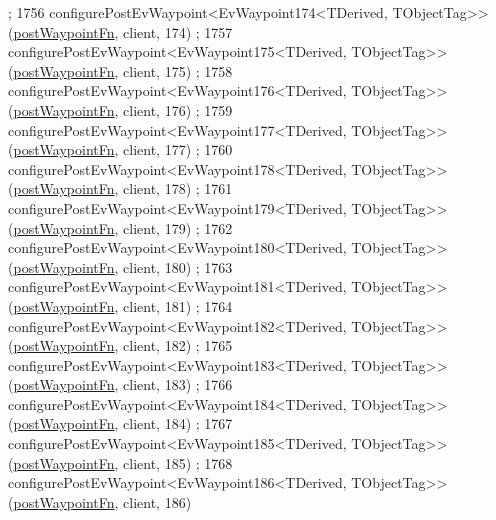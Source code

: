 \begin{DoxyCode}
      ;
1756     configurePostEvWaypoint<EvWaypoint174<TDerived, TObjectTag>>(\hyperlink{classcl__move__base__z_1_1WaypointEventDispatcher_a964a57fcce5d48ec60243230722d8dd7}{postWaypointFn}, client, 174)
      ;
1757     configurePostEvWaypoint<EvWaypoint175<TDerived, TObjectTag>>(\hyperlink{classcl__move__base__z_1_1WaypointEventDispatcher_a964a57fcce5d48ec60243230722d8dd7}{postWaypointFn}, client, 175)
      ;
1758     configurePostEvWaypoint<EvWaypoint176<TDerived, TObjectTag>>(\hyperlink{classcl__move__base__z_1_1WaypointEventDispatcher_a964a57fcce5d48ec60243230722d8dd7}{postWaypointFn}, client, 176)
      ;
1759     configurePostEvWaypoint<EvWaypoint177<TDerived, TObjectTag>>(\hyperlink{classcl__move__base__z_1_1WaypointEventDispatcher_a964a57fcce5d48ec60243230722d8dd7}{postWaypointFn}, client, 177)
      ;
1760     configurePostEvWaypoint<EvWaypoint178<TDerived, TObjectTag>>(\hyperlink{classcl__move__base__z_1_1WaypointEventDispatcher_a964a57fcce5d48ec60243230722d8dd7}{postWaypointFn}, client, 178)
      ;
1761     configurePostEvWaypoint<EvWaypoint179<TDerived, TObjectTag>>(\hyperlink{classcl__move__base__z_1_1WaypointEventDispatcher_a964a57fcce5d48ec60243230722d8dd7}{postWaypointFn}, client, 179)
      ;
1762     configurePostEvWaypoint<EvWaypoint180<TDerived, TObjectTag>>(\hyperlink{classcl__move__base__z_1_1WaypointEventDispatcher_a964a57fcce5d48ec60243230722d8dd7}{postWaypointFn}, client, 180)
      ;
1763     configurePostEvWaypoint<EvWaypoint181<TDerived, TObjectTag>>(\hyperlink{classcl__move__base__z_1_1WaypointEventDispatcher_a964a57fcce5d48ec60243230722d8dd7}{postWaypointFn}, client, 181)
      ;
1764     configurePostEvWaypoint<EvWaypoint182<TDerived, TObjectTag>>(\hyperlink{classcl__move__base__z_1_1WaypointEventDispatcher_a964a57fcce5d48ec60243230722d8dd7}{postWaypointFn}, client, 182)
      ;
1765     configurePostEvWaypoint<EvWaypoint183<TDerived, TObjectTag>>(\hyperlink{classcl__move__base__z_1_1WaypointEventDispatcher_a964a57fcce5d48ec60243230722d8dd7}{postWaypointFn}, client, 183)
      ;
1766     configurePostEvWaypoint<EvWaypoint184<TDerived, TObjectTag>>(\hyperlink{classcl__move__base__z_1_1WaypointEventDispatcher_a964a57fcce5d48ec60243230722d8dd7}{postWaypointFn}, client, 184)
      ;
1767     configurePostEvWaypoint<EvWaypoint185<TDerived, TObjectTag>>(\hyperlink{classcl__move__base__z_1_1WaypointEventDispatcher_a964a57fcce5d48ec60243230722d8dd7}{postWaypointFn}, client, 185)
      ;
1768     configurePostEvWaypoint<EvWaypoint186<TDerived, TObjectTag>>(\hyperlink{classcl__move__base__z_1_1WaypointEventDispatcher_a964a57fcce5d48ec60243230722d8dd7}{postWaypointFn}, client, 186)

\end{DoxyCode}
